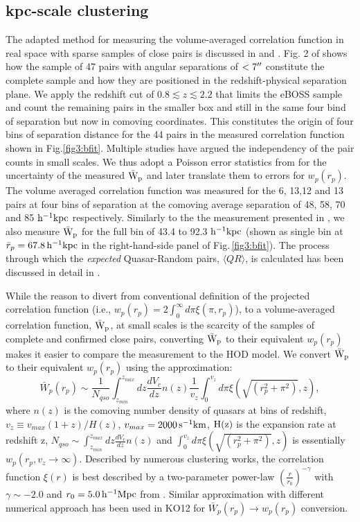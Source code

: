 \documentclass[useAMS,usenatbib]{mn2e}
\begin{document}
\subsection{kpc-scale clustering}\label{kpcls}
The adapted method for measuring the volume-averaged correlation function in real space with sparse samples of close pairs is discussed in \citet{ef17} and \citet{Hen06}. Fig. 2 of \citet{ef17} shows how the sample of 47 pairs with angular separations of $<7\arcsec$ constitute the complete sample and how they are positioned in the redshift-physical separation plane. We apply the redshift cut of $0.8 \lesssim z \lesssim 2.2$ that limits the eBOSS sample and count the remaining pairs in the smaller box and still in the same four bind of separation but now in comoving coordinates. This constitutes the origin of four bins of separation distance for the 44 pairs in the measured correlation function shown in Fig.\ref{fig3:bfit}. Multiple studies have argued the independency of the pair counts in small scales. We thus adopt a Poisson error statistics from \citet{geh86} for the uncertainty of the measured $\rm \bar W_p$ and later translate them to errors for $w_p(r_p)$. The volume averaged correlation function was measured for the 6, 13,12 and 13 pairs at four bins of separation at the comoving average separation of 48, 58, 70 and 85 $\rm h^{-1} kpc$ respectively. Similarly to the the measurement presented in \citet{ef17}, we also measure $\rm \bar W_p$ for the full bin of 43.4 to 92.3 $\rm h^{-1} kpc$ (shown as single bin at $\bar r_p = 67.8 \, \rm h^{-1} kpc$ in the right-hand-side panel of Fig.\,\ref{fig3:bfit}). The process through which the {\it expected} Quasar-Random pairs, $\langle QR \rangle$, is calculated has been discussed in detail in \citet{ef17}. 

While the reason to divert from conventional definition of the projected 
correlation function (i.e., $w_p(r_p)=2\int_{0}^{\infty} d\pi \xi(\pi, r_p)$), to a volume-averaged correlation function, 
$\rm \bar W_p$, at small scales is the scarcity of the samples of complete and 
confirmed close pairs, converting $\rm \bar W_p$ to their equivalent $w_p(r_p)$ makes it easier to compare the measurement to the HOD model. 
 We convert $\rm \bar W_p$ to their equivalent $w_p(r_p)$ using the approximation:
\begin{equation}
 \bar W_p(r_p) \sim \frac{1}{N_{qso}} \int_{z_{min}}^{z_{max}} dz \frac{dV_c}{dz} n(z) \frac{1}{v_z} \int_{0}^{v_z} d\pi \xi(\sqrt{\left(r_p^2+\pi^2\right)},z),
\end{equation}
where $n(z)$ is the comoving number density of quasars at bins of redshift, $v_z \equiv v_{max}(1+z)/H(z)$, $v_{max}= 2000 \, \rm s^{-1}km$, $\rm H(z)$ is the expansion rate at redshift z, $N_{qso} \sim \int_{z_{min}}^{z_{max}} dz \frac{dV_c}{dz} n(z)$ and $\int_{0}^{v_z} d\pi \xi(\sqrt{\left(r_p^2+\pi^2 \right)},z)$ is essentially $w_p(r_p, v_z \rightarrow \infty)$. Described by numerous clustering works, the correlation function $\xi(r)$ is best described by a two-parameter power-law $(\frac{r}{r_0})^{-\gamma}$ with $\gamma \sim -2.0$ and $r_0=5.0 \,  \rm h^{-1} Mpc$ from \citet{ef17}. Similar approximation with different numerical approach has been used in KO12 for $ \bar W_p(r_p) \rightarrow w_p(r_p)$ conversion.
\end{document}
